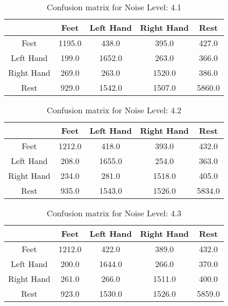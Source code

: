 \begin{table}[!htbp]
    \centering
    \begin{tabular}{|c||c|c|c|c|}
        \hline
		 & Feet & Left Hand & Right Hand & Rest \\
        \hline
        \hline
        Feet & 1195.0 & 438.0 & 395.0 & 427.0 \\
        \hline
        Left Hand & 199.0 & 1652.0 & 263.0 & 366.0 \\
        \hline
        Right Hand & 269.0 & 263.0 & 1520.0 & 386.0 \\
        \hline
        Rest & 929.0 & 1542.0 & 1507.0 & 5860.0 \\
        \hline
    \end{tabular}
    \caption{Confusion matrix for Noise Level: 4.1}
\end{table}

\begin{table}[!htbp]
    \centering
    \begin{tabular}{|c||c|c|c|c|}
        \hline
		 & Feet & Left Hand & Right Hand & Rest \\
        \hline
        \hline
        Feet & 1212.0 & 418.0 & 393.0 & 432.0 \\
        \hline
        Left Hand & 208.0 & 1655.0 & 254.0 & 363.0 \\
        \hline
        Right Hand & 234.0 & 281.0 & 1518.0 & 405.0 \\
        \hline
        Rest & 935.0 & 1543.0 & 1526.0 & 5834.0 \\
        \hline
    \end{tabular}
    \caption{Confusion matrix for Noise Level: 4.2}
\end{table}

\begin{table}[!htbp]
    \centering
    \begin{tabular}{|c||c|c|c|c|}
        \hline
		 & Feet & Left Hand & Right Hand & Rest \\
        \hline
        \hline
        Feet & 1212.0 & 422.0 & 389.0 & 432.0 \\
        \hline
        Left Hand & 200.0 & 1644.0 & 266.0 & 370.0 \\
        \hline
        Right Hand & 261.0 & 266.0 & 1511.0 & 400.0 \\
        \hline
        Rest & 923.0 & 1530.0 & 1526.0 & 5859.0 \\
        \hline
    \end{tabular}
    \caption{Confusion matrix for Noise Level: 4.3}
\end{table}

